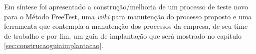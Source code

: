 Em síntese foi apresentado a construção/melhoria de um processo de teste novo para o Método FreeTest, uma \textit{wiki} para manutenção do processo proposto e uma ferramenta que contempla a manutenção dos processos da empresa, de seu time de trabalho e por fim, um guia de implantação que será mostrado no capítulo \ref{sec:construcaoguiaimplantacao}.